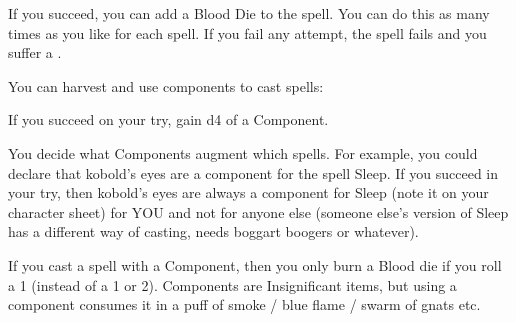 {

If you succeed, you can add a Blood Die to the spell.  You can do this as many times as you like for each spell. If you fail any \RO attempt, the spell fails and you suffer a .




You can harvest and use components to cast spells:


If you succeed on your \RO try, gain d4 \UD of a Component.

You decide what Components augment which spells. For example, you could declare that kobold's eyes are a component for the spell Sleep.  If you succeed in your \RO try, then kobold's eyes are always a component for Sleep (note it on your character sheet) for YOU and not for anyone else (someone else's version of Sleep has a different way of casting, needs boggart boogers or whatever). 

If you cast a spell with a Component, then you only burn a Blood die if you roll a 1 (instead of a 1 or 2).  Components are Insignificant items, but using a component consumes it in a puff of smoke / blue flame / swarm of gnats etc.



}
